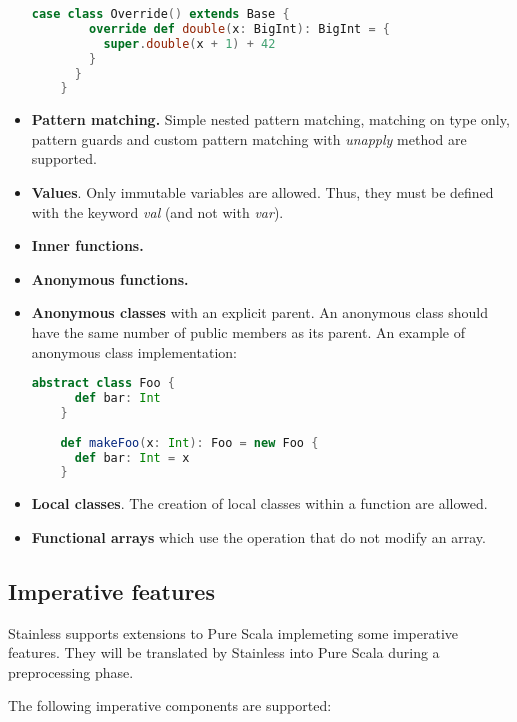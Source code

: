 \begin{itemize}
\begin{lstlisting}[language=Scala]
      case class Override() extends Base {
        override def double(x: BigInt): BigInt = {
          super.double(x + 1) + 42
        }
      }
    }
  \end{lstlisting}
  \item \textbf{Pattern matching.} 
  Simple nested pattern matching, matching on type only, pattern guards and custom pattern matching with \textit{unapply} method are supported.
  \item \textbf{Values}. 
  Only immutable variables are allowed. Thus, they must be defined with the keyword \textit{val} (and not with \textit{var}).
  \item \textbf{Inner functions.}
  \item \textbf{Anonymous functions.}
  \item \textbf{Anonymous classes} with an explicit parent. 
  An anonymous class should have the same number of public members as its parent.
  An example of anonymous class implementation:
  \begin{lstlisting}[language=Scala]
    abstract class Foo {
      def bar: Int
    }
    
    def makeFoo(x: Int): Foo = new Foo {
      def bar: Int = x
    }
  \end{lstlisting}
  \item \textbf{Local classes}. 
  The creation of local classes within a function are allowed. \cite{Stainless:pure_scala}
  \item \textbf{Functional arrays} which use the operation that do not modify an array.
\end{itemize}


\subsection{Imperative features}

Stainless supports extensions to Pure Scala implemeting some imperative features.
They will be translated by Stainless into Pure Scala during a preprocessing phase.

The following imperative components are supported:

